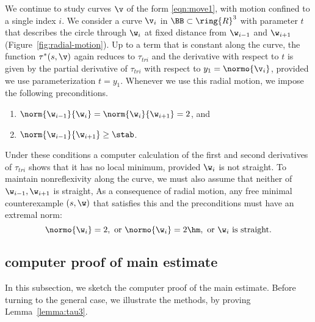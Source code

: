 %
\begin{remark}\label{rem:radial}
  We continue to study curves $\v$ of the form \eqref{eqn:move1}, with
  motion confined to a single index $i$.  We consider a curve $\v_i$
  in $\BB\subset\ring{R}^3$ with parameter $t$ that describes the
  circle through $\w_i$ at fixed distance from $\w_{i-1}$ and
  $\w_{i+1}$ (Figure~\ref{fig:radial-motion}).  Up to a term that is
  constant along the curve, the function $\tau^*(s,\v)$ again reduces
  to $\tau_{tri}$ and the derivative with respect to $t$ is given by
  the partial derivative of $\tau_{tri}$ with respect to
  $y_1=\normo{\v_i}$, provided we use parameterization $t=y_1$.
  Whenever we use this radial motion, we impose the following preconditions.
\begin{enumerate}
\item $\norm{\w_{i-1}}{\w_i}=\norm{\w_i}{\w_{i+1}}=2$, and
\item $\norm{\w_{i-1}}{\w_{i+1}} \ge \stab$.
\end{enumerate}
Under these conditions a computer calculation of the first and second
derivatives of $\tau_{tri}$ shows that it has no local minimum, provided
$\w_i$ is not straight.
To maintain nonreflexivity along the curve, we must also assume that
 neither of $\w_{i-1},\w_{i+1}$ is straight,
As a consequence of radial motion,  
any free minimal counterexample $(s,\w)$ that satisfies this and
the preconditions
must have an extremal norm:
\begin{equation}\label{eqn:extremal}
\normo{\w_i}=2,\text{ or } \normo{\w_i}=2\hm, \text{ or } \w_i
\text{ is straight.}
\end{equation}
\end{remark}

\figMVFCDJQ %


\subsection{computer proof of main estimate}

In this subsection, we sketch the computer proof of the main estimate.
Before turning to the general case, we illustrate the methods, by
proving Lemma~\ref{lemma:tau3}.

